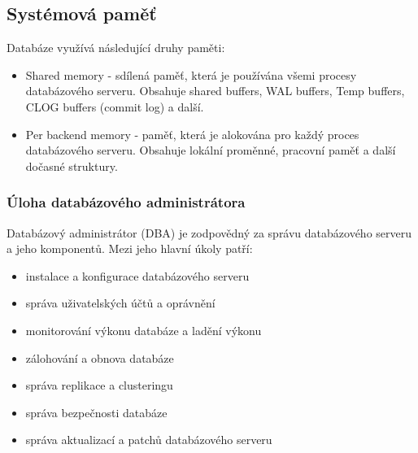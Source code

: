 \subsection{Systémová paměť}
Databáze využívá následující druhy paměti:
\begin{itemize}
    \item Shared memory - sdílená paměť, která je používána všemi procesy databázového serveru. Obsahuje shared buffers, WAL buffers, Temp buffers, CLOG buffers (commit log) a další.
    \item Per backend memory - paměť, která je alokována pro každý proces databázového serveru. Obsahuje lokální proměnné, pracovní paměť a další dočasné struktury.
\end{itemize}

\subsubsection{Úloha databázového administrátora}
Databázový administrátor (DBA) je zodpovědný za správu databázového serveru a jeho komponentů. Mezi jeho hlavní úkoly patří:
\begin{itemize}
    \item instalace a konfigurace databázového serveru
    \item správa uživatelských účtů a oprávnění
    \item monitorování výkonu databáze a ladění výkonu
    \item zálohování a obnova databáze
    \item správa replikace a clusteringu
    \item správa bezpečnosti databáze
    \item správa aktualizací a patchů databázového serveru
\end{itemize}
